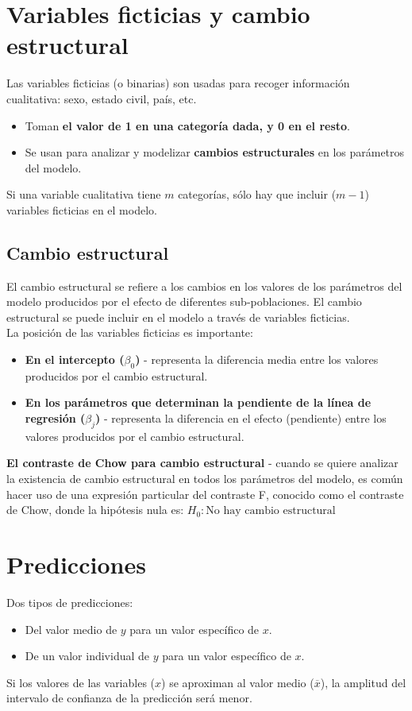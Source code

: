 \documentclass[10pt, a4paper, landscape]{extarticle}
\begin{document}
\begin{multicols}{3}
\section*{Variables ficticias y cambio estructural}
	Las variables ficticias (o binarias) son usadas para recoger información cualitativa: sexo, estado civil, país, etc.
	\begin{itemize}[leftmargin=*]
		\item Toman \textbf{el valor de 1 en una categoría dada, y 0 en el resto}.
		\item Se usan para analizar y modelizar \textbf{cambios estructurales} en los parámetros del modelo.
	\end{itemize}
	Si una variable cualitativa tiene $m$ categorías, sólo hay que incluir ($m-1$) variables ficticias en el modelo.
	\subsection*{Cambio estructural}
		El cambio estructural se refiere a los cambios en los valores de los parámetros del modelo producidos por el efecto de diferentes sub-poblaciones. El cambio estructural se puede incluir en el modelo a través de variables ficticias.
		\\ La posición de las variables ficticias es importante:
		\begin{itemize}[leftmargin=*]
			\item \textbf{En el intercepto ($\beta_0$)} - representa la diferencia media entre los valores producidos por el cambio estructural.
			\item \textbf{En los parámetros que determinan la pendiente de la línea de regresión ($\beta_j$)} - representa la diferencia en el efecto (pendiente) entre los valores producidos por el cambio estructural.
		\end{itemize}
		\textbf{El contraste de Chow para cambio estructural} - cuando se quiere analizar la existencia de cambio estructural en todos los parámetros del modelo, es común hacer uso de una expresión particular del contraste F, conocido como el contraste de Chow, donde la hipótesis nula es: $H_0: \text{No hay cambio estructural}$

\section*{Predicciones}
	Dos tipos de predicciones:
	\begin{itemize}[leftmargin=*]
		\item Del valor medio de $y$ para un valor específico de $x$.
		\item De un valor individual de $y$ para un valor específico de $x$.
	\end{itemize}
	Si los valores de las variables ($x$) se aproximan al valor medio ($\overline{x}$), la amplitud del intervalo de confianza de la predicción será menor. 


\end{multicols}
\end{document}
